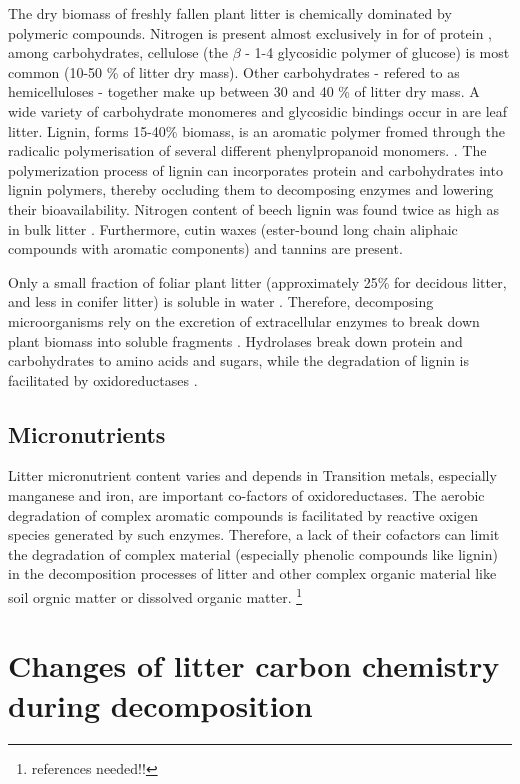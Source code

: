 The dry biomass of freshly fallen plant litter is chemically dominated by polymeric compounds. Nitrogen is present almost exclusively in for of protein \citep{Wanek2010}, among carbohydrates, cellulose (the $\beta$ - 1-4 glycosidic polymer of glucose) is most common (10-50 \% of litter dry mass). Other carbohydrates - refered to as hemicelluloses - together make up between 30 and 40 \% of litter dry mass. A wide variety of carbohydrate monomeres and glycosidic bindings occur in are leaf litter. Lignin, forms 15-40\% biomass, is an aromatic polymer fromed through the radicalic polymerisation of several different phenylpropanoid monomers. \citep[pp. 54f]{Berg2008}.  The polymerization process of lignin can incorporates protein and carbohydrates into lignin polymers, thereby occluding them to decomposing enzymes and lowering their bioavailability. Nitrogen content of beech lignin was found twice as high as in bulk litter \citep{Dykmans2002}. Furthermore, cutin waxes (ester-bound long chain aliphaic compounds with aromatic components) and tannins are present.

Only a small fraction of foliar plant litter (approximately 25\% for decidous litter, and less in conifer litter) is soluble in water \citep{Berg2008}. Therefore, decomposing microorganisms rely on the excretion of extracellular enzymes to break down plant biomass into soluble fragments \cite{Klotzbucher2011}. Hydrolases break down protein and carbohydrates to amino acids and sugars, while the degradation of lignin is facilitated by oxidoreductases \citep{Sinsabaugh2011}.

\subsection{Micronutrients}

Litter micronutrient content varies and depends in 
Transition metals, especially manganese and iron, are important co-factors of oxidoreductases. The aerobic degradation of complex aromatic compounds is facilitated by reactive oxigen species generated by such enzymes. Therefore, a lack of their cofactors can limit the degradation of complex material (especially phenolic compounds like lignin) in the decomposition processes of litter and other complex organic material like soil orgnic matter or dissolved organic matter. \footnote{references needed!!}

\section{Changes of litter carbon chemistry during decomposition}

